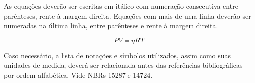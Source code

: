 \documentclass[../main.tex]{subfiles}
\begin{document}
  As equações deverão ser escritas em itálico com numeração consecutiva entre parênteses, rente à margem direita. Equações com mais de uma linha deverão ser numeradas na última linha, entre parênteses e rente à margem direita.

  \begin{equation}
    PV = \eta RT
  \end{equation}

  Caso necessário, a lista de notações e símbolos utilizados, assim como  suas unidades de medida, deverá ser relacionada antes das referências  bibliográficas por ordem alfabética. Vide NBRs 15287 e 14724.
\end{document}
